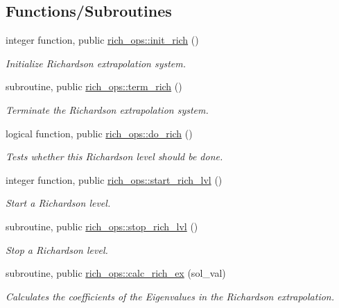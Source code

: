 \subsection*{Functions/\+Subroutines}
\begin{DoxyCompactItemize}
\item 
integer function, public \hyperlink{namespacerich__ops_a9fbbda93eab8973d33063e277c489e7b}{rich\+\_\+ops\+::init\+\_\+rich} ()
\begin{DoxyCompactList}\small\item\em Initialize Richardson extrapolation system. \end{DoxyCompactList}\item 
subroutine, public \hyperlink{namespacerich__ops_a3cf72a3ed0806ac9ddff262a00b2e33d}{rich\+\_\+ops\+::term\+\_\+rich} ()
\begin{DoxyCompactList}\small\item\em Terminate the Richardson extrapolation system. \end{DoxyCompactList}\item 
logical function, public \hyperlink{namespacerich__ops_a50f4088b9ddd59597987fb4112f2a73e}{rich\+\_\+ops\+::do\+\_\+rich} ()
\begin{DoxyCompactList}\small\item\em Tests whether this Richardson level should be done. \end{DoxyCompactList}\item 
integer function, public \hyperlink{namespacerich__ops_a97206a15127960366fcb41d6889cb3b5}{rich\+\_\+ops\+::start\+\_\+rich\+\_\+lvl} ()
\begin{DoxyCompactList}\small\item\em Start a Richardson level. \end{DoxyCompactList}\item 
subroutine, public \hyperlink{namespacerich__ops_a0cce16b835e18b025d366a038b22efe1}{rich\+\_\+ops\+::stop\+\_\+rich\+\_\+lvl} ()
\begin{DoxyCompactList}\small\item\em Stop a Richardson level. \end{DoxyCompactList}\item 
subroutine, public \hyperlink{namespacerich__ops_ad2717df0206a397d0d7845a96aa5da23}{rich\+\_\+ops\+::calc\+\_\+rich\+\_\+ex} (sol\+\_\+val)
\begin{DoxyCompactList}\small\item\em Calculates the coefficients of the Eigenvalues in the Richardson extrapolation. \end{DoxyCompactList}\item 

\end{DoxyCompactItemize}
